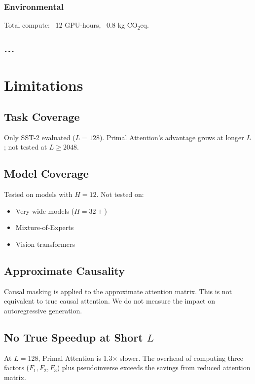 \subsubsection{Environmental}
Total compute: ~12 GPU-hours, ~0.8 kg CO$_2$eq.
\begin{lstlisting}

---
\end{lstlisting}


\section{Limitations}

\subsection{Task Coverage}

Only SST-2 evaluated ($L = 128$). Primal Attention's advantage grows at 
longer $L$; not tested at $L \ge 2048$.

\subsection{Model Coverage}

Tested on models with $H = 12$. Not tested on:
\begin{itemize}
\item Very wide models ($H = 32+$)
\item Mixture-of-Experts
\item Vision transformers

\end{itemize}
\subsection{Approximate Causality}

Causal masking is applied to the approximate attention matrix. This is 
not equivalent to true causal attention. We do not measure the impact on 
autoregressive generation.

\subsection{No True Speedup at Short $L$}

At $L = 128$, Primal Attention is 1.3$\times$ slower. The overhead of 
computing three factors ($F_1, F_2, F_3$) plus pseudoinverse exceeds the 
savings from reduced attention matrix.

